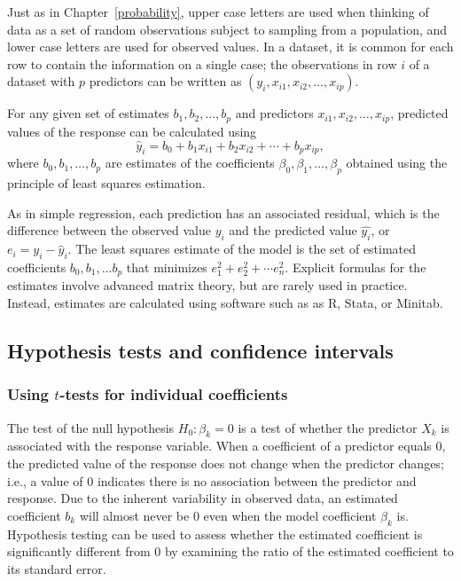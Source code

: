 Just as in Chapter~\ref{probability}, upper case letters are used when thinking of data as a set of random observations subject to sampling from a population, and lower case letters are used for observed values. In a dataset, it is common for each row to contain the information on a single case; the observations in row $i$ of a dataset with $p$ predictors can be written as $(y_i, x_{i1}, x_{i2}, \ldots, x_{ip})$.

For any given set of estimates $b_1, b_2,\ldots,b_p$ and predictors $x_{i1},x_{i2},\ldots,x_{ip}$, predicted values of the response can be calculated using
\[
   \hat{y}_i = b_0 + b_1 x_{i1} + b_2 x_{i2} +\cdots + b_p x_{ip},
\]
where $b_0, b_1, \dots, b_p$ are estimates of the coefficients $\beta_0, \beta_1, \dots, \beta_p$ obtained using the principle of least squares estimation. 

As in simple regression, each prediction has an associated residual, which is the difference between the observed value $y_i$ and the predicted value $\hat{y_i}$, or $e_i = y_i - \hat{y}_i$. The least squares estimate of the model is the set of estimated coefficients $b_0, b_1, \ldots b_p$ that minimizes $e_1^2 + e_2^2 + \cdots e_n^2$. Explicit formulas for the estimates involve advanced matrix theory, but are rarely used in practice.  Instead, estimates are calculated using software such as as \textsf{R}, Stata, or Minitab.


\textD{\newpage}


\subsection{Hypothesis tests and confidence intervals}


\subsubsection{Using $t$-tests for individual coefficients}

The test of the null hypothesis $H_0: \beta_k = 0$ is a test of whether the predictor $X_k$ is associated with the response variable. When a coefficient of a predictor equals 0, the predicted value of the response does not change when the predictor changes; i.e., a value of 0 indicates there is no association between the predictor and response. Due to the inherent variability in observed data, an estimated coefficient $b_k$ will almost never be 0 even when the model coefficient $\beta_k$ is. Hypothesis testing can be used to assess whether the estimated coefficient is significantly different from 0 by examining the ratio of the estimated coefficient to its standard error.

